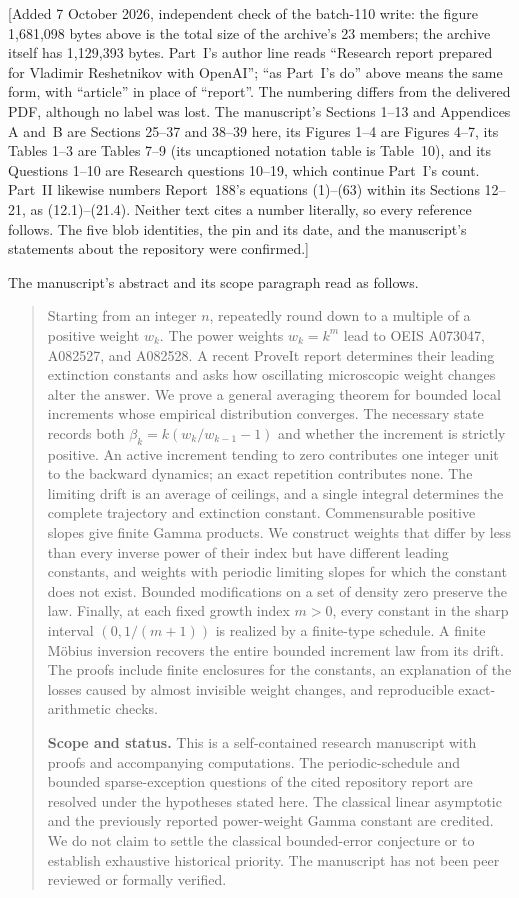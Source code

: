 [Added 7 October 2026, independent check of the batch-110 write: the
figure 1,681,098 bytes above is the total size of the archive's 23
members; the archive itself has 1,129,393 bytes. Part~I's author line
reads ``Research report prepared for Vladimir Reshetnikov with OpenAI'';
``as Part~I's do'' above means the same form, with ``article'' in place of
``report''. The numbering differs from the delivered PDF, although no
label was lost. The manuscript's Sections 1--13 and Appendices A and~B
are Sections 25--37 and 38--39 here, its Figures 1--4 are Figures 4--7,
its Tables 1--3 are Tables 7--9 (its uncaptioned notation table is
Table~10), and its
Questions 1--10 are Research questions 10--19, which continue Part~I's
count. Part~II likewise numbers Report~188's equations (1)--(63) within
its Sections 12--21, as (12.1)--(21.4). Neither text cites a number
literally, so every reference follows. The five blob identities, the pin
and its date, and the manuscript's statements about the repository were
confirmed.]

The manuscript's abstract and its scope paragraph read as follows.

\begin{quote}\small
Starting from an integer $n$, repeatedly round down to a multiple of a
positive weight $w_k$. The power weights $w_k=k^m$ lead to OEIS A073047,
A082527, and A082528. A recent ProveIt report determines their leading
extinction constants and asks how oscillating microscopic weight changes
alter the answer. We prove a general averaging theorem for bounded local
increments whose empirical distribution converges. The necessary state
records both $\beta_k=k(w_k/w_{k-1}-1)$ and whether the increment is
strictly positive. An active increment tending to zero contributes one
integer unit to the backward dynamics; an exact repetition contributes
none. The limiting drift is an average of ceilings, and a single integral
determines the complete trajectory and extinction constant. Commensurable
positive slopes give finite Gamma products. We construct weights that
differ by less than every inverse power of their index but have different
leading constants, and weights with periodic limiting slopes for which
the constant does not exist. Bounded modifications on a set of density
zero preserve the law. Finally, at each fixed growth index $m>0$, every
constant in the sharp interval $(0,1/(m+1))$ is realized by a finite-type
schedule. A finite M\"obius inversion recovers the entire bounded
increment law from its drift. The proofs include finite enclosures for the constants, an
explanation of the losses caused by almost invisible weight changes,
and reproducible exact-arithmetic checks.

\noindent\textbf{Scope and status.}
This is a self-contained research manuscript with proofs and accompanying
computations. The periodic-schedule and bounded sparse-exception questions
of the cited repository report are resolved under the hypotheses stated
here. The classical linear asymptotic and the previously reported
power-weight Gamma constant are credited. We do not claim to settle the
classical bounded-error conjecture or to establish exhaustive historical
priority. The manuscript has not been peer reviewed or formally verified.
\end{quote}

